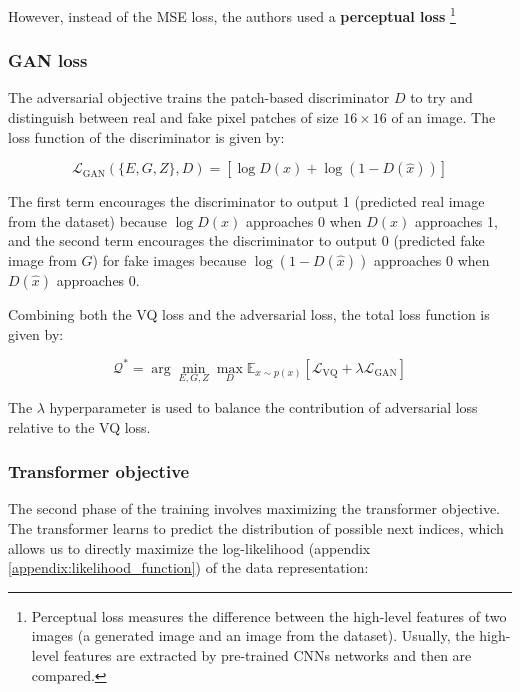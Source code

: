 However, instead of the MSE loss, the authors used a \textbf{perceptual loss} \cite{perceptual_loss} \footnote[4]{Perceptual loss measures the difference between the high-level features of two images (a generated image and an image from the dataset). Usually, the high-level features are extracted by pre-trained CNNs networks and then are compared.}







\subsubsection*{GAN loss}

The adversarial objective trains the patch-based discriminator $D$ to try and distinguish between real and fake pixel patches of size $16\times 16$ of an image. The loss function of the discriminator is given by:

\begin{equation*}
    \mathcal{L}_{\text{GAN}}(\{E,G,Z\}, D) = [\log D(x) + \log (1-D(\hat{x}))]
\end{equation*}

The first term encourages the discriminator to output 1 (predicted real image from the dataset) because $\log D(x)$ approaches 0 when $D(x)$ approaches 1, and the second term encourages the discriminator to output 0 (predicted fake image from $G$) for fake images because $\log (1-D(\hat{x}))$ approaches 0 when $D(\hat{x})$ approaches 0.

Combining both the VQ loss and the adversarial loss, the total loss function is given by:

\begin{equation*}
    \mathcal{Q^*} = \arg \min_{E, G, Z} \max_D \mathbb{E}_{x \sim p(x)} [\mathcal{L}_{\text{VQ}} + \lambda \mathcal{L}_{\text{GAN}}]
\end{equation*}

The $\lambda$ hyperparameter is used to balance the contribution of adversarial loss relative to the VQ loss.






\subsubsection*{Transformer objective}

The second phase of the training involves maximizing the transformer objective. The transformer learns to predict the distribution of possible next indices, which allows us to directly maximize the log-likelihood (appendix \ref{appendix:likelihood_function}) of the data representation:

